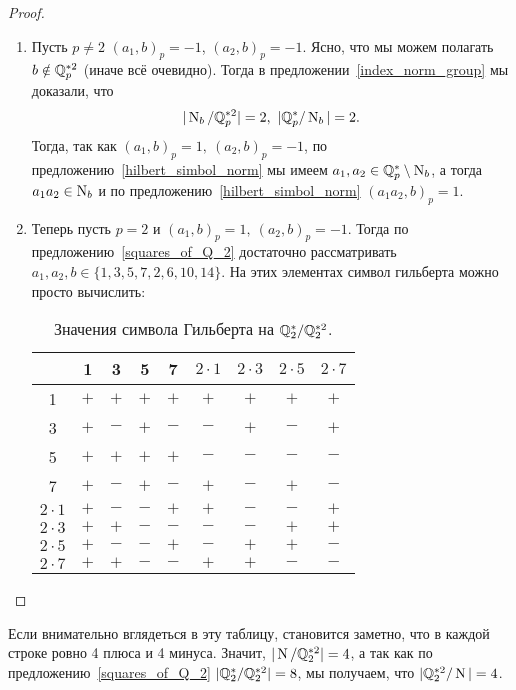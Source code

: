 \begin{proof}
\begin{enumerate}
			 \item Пусть $p \neq 2$  $(a_1, b)_{p} = -1$, $(a_2, b)_{p} = -1$. Ясно, что мы можем полагать $b \notin \mathbb{Q}_{p}^{*2}$ (иначе всё очевидно). Тогда в предложении~\ref{index_norm_group} мы доказали, что 
			 \[
			  	|\Nm_{b}/\Q_{p}^{*2}| = 2, \ |\Q_{p}^{*}/\Nm_{b}| = 2.
			  \] 
			  Тогда, так как $(a_1, b)_{p} = 1, \ (a_{2}, b)_{p} = -1$, по предложению~\ref{hilbert_simbol_norm} мы имеем $a_1, a_2 \in \mathbb{Q}_{p}^{*} \setminus \operatorname{\mathrm{N}}_{b}$, а тогда $a_1 a_2 \in \operatorname{\mathrm{N}}_{b}$ и по предложению~\ref{hilbert_simbol_norm} $(a_1 a_2, b)_{p} = 1$. 
			  \item Теперь пусть $p = 2$ и $(a_1, b)_{p} = 1, \ (a_{2}, b)_{p} = -1$. Тогда по предложению~\ref{squares_of_Q_2} достаточно рассматривать $a_1, a_2, b \in \{ 1, 3, 5, 7, 2, 6, 10, 14 \}$. На этих элементах символ гильберта можно просто вычислить: 
			  \begin{table}
			    \centering
			    \begin{tabular}{c|c|c|c|c|c|c|c|c}
			         & 1 & 3 & 5 & 7 & $2 \cdot 1$ & $2\cdot 3$ & $2 \cdot 5$ & $2 \cdot 7$ \\ \hline
			         1 & $+$ & $+$ & $+$ & $+$ & $+$ & $+$ & $+$ & $+$\\ \hline
			         3 & $+$ & $-$ & $+$ & $-$ & $-$ & $+$ & $-$ & $+$ \\ \hline
			         5 & $+$ & $+$ & $+$ & $+$ & $-$ & $-$ & $-$ & $-$ \\ \hline
			         7 & $+$ & $-$ & $+$ & $-$ & $+$ & $-$ & $+$ & $-$ \\ \hline
			         $2 \cdot 1$ & $+$ & $-$ & $-$ & $+$ & $+$ & $-$ & $-$ & $+$\\ \hline
			         $2 \cdot 3$ & $+$ & $+$ & $-$ & $-$ & $-$ & $-$ & $+$ & $+$\\ \hline
			         $2 \cdot 5$ & $+$ & $-$ & $-$ & $+$ & $-$ & $+$ & $+$ & $-$\\ \hline
			         $2 \cdot 7$ & $+$ & $+$ & $-$ & $-$ & $+$ & $+$ & $-$ & $-$\\ 
			    \end{tabular}
			    \caption{Значения символа Гильберта на $\mathbb{Q}_{2}^{*}/\mathbb{Q}_{2}^{*2}$.}
			    \label{tab:hilbert_Q_2}
			\end{table}

		\end{enumerate}
		\end{proof}

		\begin{remark}
			Если внимательно вглядеться в эту таблицу, становится заметно, что в каждой строке ровно 4 плюса и 4 минуса. Значит, $|\operatorname{\mathrm{N}}/\mathbb{Q}_{2}^{*2}| = 4$, а так как по предложению~\ref{squares_of_Q_2} $|\mathbb{Q}_{2}^{*}/\mathbb{Q}_{2}^{*2}| = 8$, мы получаем, что $|\mathbb{Q}_{2}^{*2}/\operatorname{\mathrm{N}}| = 4$. 
		\end{remark}

